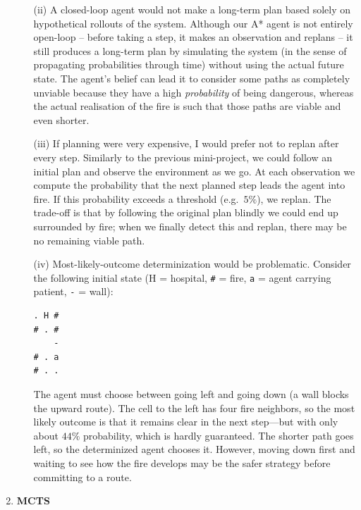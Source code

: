 \documentclass{64110}
\begin{document}
\begin{enumerate}
\begin{enumerate}
\item[(ii)]
A closed-loop agent would not make a long-term plan based solely on hypothetical rollouts
of the system. Although our A* agent is not entirely open-loop -- before taking a step, it
makes an observation and replans -- it still produces a long-term plan by simulating
the system (in the sense of propagating probabilities through time) without using the actual future
state. The agent's belief can lead it to consider some paths as completely unviable
because they have a high \emph{probability} of being dangerous, whereas the actual
realisation of the fire is such that those paths are viable and even shorter.

\item[(iii)]
If planning were very expensive, I would prefer not to replan after every step. Similarly
to the previous mini-project, we could follow an initial plan and observe the environment as we
go. At each observation we compute the probability that the next planned step leads the
agent into fire. If this probability exceeds a threshold (e.g.\ $5\%$), we replan.
The trade-off is that by following the original plan blindly we could end up surrounded
by fire; when we finally detect this and replan, there may be no remaining viable path.

\item[(iv)]
Most-likely-outcome determinization would be problematic. Consider the following initial
state (H = hospital, \texttt{\#} = fire, \texttt{a} = agent carrying patient,
\texttt{-} = wall):

\begin{verbatim}
. H #
# . #
    -
# . a
# . .
\end{verbatim}

The agent must choose between going left and going down (a wall blocks the upward route).
The cell to the left has four fire neighbors, so the most likely outcome is that it
remains clear in the next step---but with only about $44\%$ probability, which is hardly
guaranteed. The shorter path goes left, so the determinized agent chooses it.
However, moving down first and waiting to see how the fire develops may be the safer
strategy before committing to a route.

\end{enumerate}


\item \textbf{MCTS}

\begin{enumerate}


\end{enumerate}
\end{enumerate}
\end{document}
